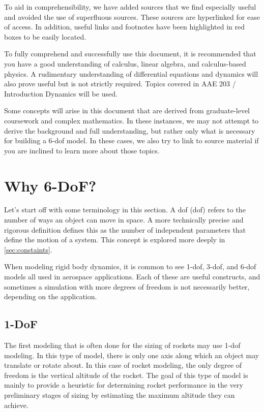 \documentclass[12pt]{report}
\begin{document}
To aid in comprehensibility, we have added sources that we find especially useful and avoided the use of superfluous sources. These sources are hyperlinked for ease of access. In addition, useful links and footnotes have been highlighted in red boxes to be easily located. 

To fully comprehend and successfully use this document, it is recommended that you have a good understanding of calculus, linear algebra, and calculus-based physics. A rudimentary understanding of differential equations and dynamics will also prove useful but is not strictly required. Topics covered in AAE 203 / Introduction Dynamics will be used. 

Some concepts will arise in this document that are derived from graduate-level coursework and complex mathematics. In these instances, we may not attempt to derive the background and full understanding, but rather only what is necessary for building a 6-\gls{dof} model. In these cases, we also try to link to source material if you are inclined to learn more about those topics.

\section{Why 6-DoF?}
Let’s start off with some terminology in this section. A \acrlong{dof} (\gls{dof}) refers to the number of ways an object can move in space. A more technically precise and rigorous definition defines this as the number of independent parameters that define the motion of a system. This concept is explored more deeply in \ref{sec:constaints}.  

When modeling rigid body dynamics, it is common to see 1-\gls{dof}, 3-\gls{dof}, and 6-\gls{dof} models all used in aerospace applications. Each of these are useful constructs, and sometimes a simulation with more degrees of freedom is not necessarily better, depending on the application.
\subsection{1-DoF}
The first modeling that is often done for the sizing of rockets may use 1-\gls{dof} modeling. In this type of model, there is only one axis along which an object may translate or rotate about. In this case of rocket modeling, the only degree of freedom is the vertical altitude of the rocket. The goal of this type of model is mainly to provide a heuristic for determining rocket performance in the very preliminary stages of sizing by estimating the maximum altitude they can achieve.
\end{document}
